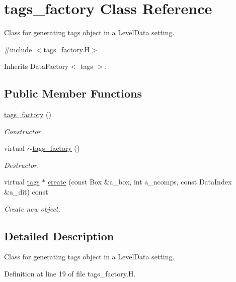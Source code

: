 \hypertarget{classtags__factory}{}\section{tags\+\_\+factory Class Reference}
\label{classtags__factory}


Class for generating tags object in a Level\+Data setting.  




{\ttfamily \#include $<$tags\+\_\+factory.\+H$>$}



Inherits Data\+Factory$<$ tags $>$.

\subsection*{Public Member Functions}
\begin{DoxyCompactItemize}
\item 
\hyperlink{classtags__factory_a7aef90b949841cf57d845f979ae37ade}{tags\+\_\+factory} ()
\begin{DoxyCompactList}\small\item\em Constructor. \end{DoxyCompactList}\item 
virtual \hyperlink{classtags__factory_aefab57ae08b997eb061b491e7ab04105}{$\sim$tags\+\_\+factory} ()
\begin{DoxyCompactList}\small\item\em Destructor. \end{DoxyCompactList}\item 
virtual \hyperlink{classtags}{tags} $\ast$ \hyperlink{classtags__factory_aefda314054db842b8dc24620c59eae80}{create} (const Box \&a\+\_\+box, int a\+\_\+ncomps, const Data\+Index \&a\+\_\+dit) const 
\begin{DoxyCompactList}\small\item\em Create new object. \end{DoxyCompactList}\end{DoxyCompactItemize}


\subsection{Detailed Description}
Class for generating tags object in a Level\+Data setting. 

Definition at line 19 of file tags\+\_\+factory.\+H.



